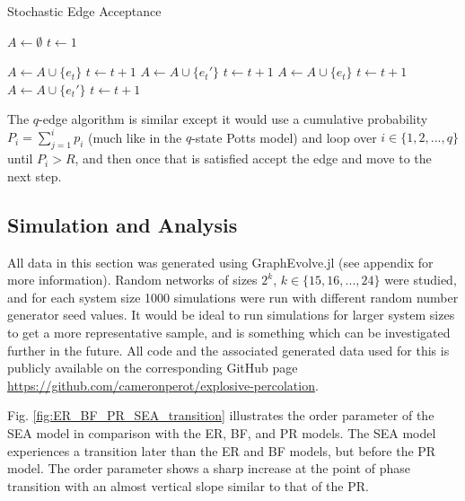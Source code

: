 \begin{algorithm}[H]
	\caption{Stochastic Edge Acceptance}\label{Stochastic-Edge-Acceptance}
	\begin{algorithmic}[1]
		\State $A \gets \emptyset$
		\State $t \gets 1$

				\State $A \gets A \cup \{e_t\}$
				\State $t \gets t+1$
				\State $A \gets A \cup \{e_t'\}$
				\State $t \gets t+1$
				\State $A \gets A \cup \{e_t\}$
				\State $t \gets t+1$
			\Else
				\State $A \gets A \cup \{e_t'\}$
				\State $t \gets t+1$
			\EndIf
		\EndWhile
	\EndProcedure
	\end{algorithmic}
\end{algorithm}

The $q$-edge algorithm is similar except it would use a cumulative probability $P_i = \sum\limits_{j=1}^{i} p_i$ (much like in the $q$-state Potts model) and loop over $i \in \{1, 2, ..., q\}$ until $P_i > R$, and then once that is satisfied accept the edge and move to the next step.



\subsection{Simulation and Analysis}
All data in this section was generated using GraphEvolve.jl (see appendix for more information).
Random networks of sizes $2^k$, $k \in \{15, 16, ..., 24\}$ were studied, and for each system size 1000 simulations were run with different random number generator seed values.
It would be ideal to run simulations for larger system sizes to get a more representative sample, and is something which can be investigated further in the future.
All code and the associated generated data used for this is publicly available on the corresponding GitHub page \url{https://github.com/cameronperot/explosive-percolation}.

Fig. \ref{fig:ER_BF_PR_SEA_transition} illustrates the order parameter of the SEA model in comparison with the ER, BF, and PR models.
The SEA model experiences a transition later than the ER and BF models, but before the PR model.
The order parameter shows a sharp increase at the point of phase transition with an almost vertical slope similar to that of the PR.

